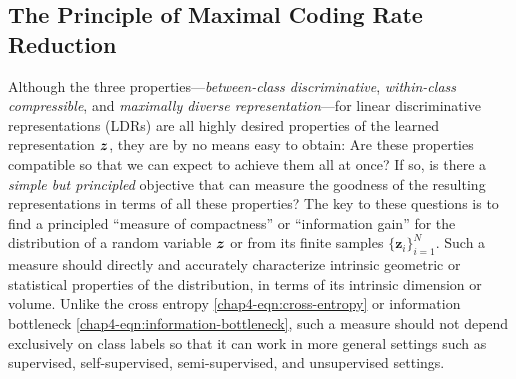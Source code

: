 \documentclass[../../book-main.tex]{subfiles}
\begin{document}
\subsection{The Principle of Maximal Coding Rate Reduction}\label{subsec:MCR2}





Although the three properties---{\em between-class discriminative}, {\em
within-class compressible}, and {\em maximally diverse representation}---for linear discriminative representations (LDRs) are all highly desired properties  of the learned representation $\bm{z}$, they are by no means easy to obtain: Are these properties compatible so that we can expect to achieve them all at once? If so, is there a {\em simple but principled} objective that can measure the goodness of the resulting representations in terms of all these properties? The key to these questions {is to find} a principled ``measure of compactness'' or ``information gain''  for the distribution of a random variable $\bm{z}$ or from its finite samples $\{\bm z_i\}_{i=1}^N$. Such a measure should directly and accurately characterize intrinsic geometric or statistical properties of the distribution, in terms of its intrinsic dimension or {volume}. Unlike the cross entropy \eqref{chap4-eqn:cross-entropy} or information bottleneck \eqref{chap4-eqn:information-bottleneck}, such a measure should not depend exclusively on class labels so that it can work in more general settings such as supervised, self-supervised, semi-supervised, and unsupervised settings.
\end{document}
